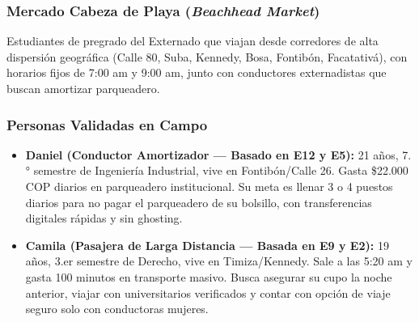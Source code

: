 \documentclass[11pt,a4paper]{article}
\begin{document}
\subsubsection{Mercado Cabeza de Playa (\textit{Beachhead Market})}
Estudiantes de pregrado del Externado que viajan desde corredores de alta dispersi\'on geogr\'afica (Calle 80, Suba, Kennedy, Bosa, Fontib\'on, Facatativ\'a), con horarios fijos de 7:00 am y 9:00 am, junto con conductores externadistas que buscan amortizar parqueadero.

\subsubsection{Personas Validadas en Campo}
\begin{itemize}[leftmargin=*]
    \item \textbf{Daniel (Conductor Amortizador --- Basado en E12 y E5):} 21 a\~nos, 7.° semestre de Ingenier\'ia Industrial, vive en Fontib\'on/Calle 26. Gasta \$22.000 COP diarios en parqueadero institucional. Su meta es llenar 3 o 4 puestos diarios para no pagar el parqueadero de su bolsillo, con transferencias digitales r\'apidas y sin ghosting.
    \item \textbf{Camila (Pasajera de Larga Distancia --- Basada en E9 y E2):} 19 a\~nos, 3.er semestre de Derecho, vive en Timiza/Kennedy. Sale a las 5:20 am y gasta 100 minutos en transporte masivo. Busca asegurar su cupo la noche anterior, viajar con universitarios verificados y contar con opci\'on de viaje seguro solo con conductoras mujeres.
\end{itemize}
\end{document}
